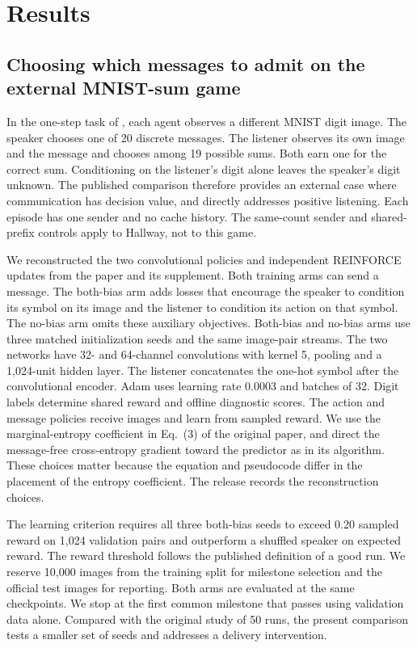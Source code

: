 \documentclass[a4paper,fleqn]{cas-dc}
\begin{document}
\section{Results}
\subsection{Choosing which messages to admit on the external MNIST-sum game}\label{sec:eccles}
In the one-step task of \citet{eccles2019biases}, each agent observes a different MNIST digit image. The speaker chooses one of 20 discrete messages. The listener observes its own image and the message and chooses among 19 possible sums. Both earn one for the correct sum. Conditioning on the listener's digit alone leaves the speaker's digit unknown. The published comparison therefore provides an external case where communication has decision value, and directly addresses positive listening. Each episode has one sender and no cache history. The same-count sender and shared-prefix controls apply to Hallway, not to this game.

We reconstructed the two convolutional policies and independent REINFORCE updates from the paper and its supplement. Both training arms can send a message. The both-bias arm adds losses that encourage the speaker to condition its symbol on its image and the listener to condition its action on that symbol. The no-bias arm omits these auxiliary objectives. Both-bias and no-bias arms use three matched initialization seeds and the same image-pair streams. The two networks have 32- and 64-channel convolutions with kernel 5, pooling and a 1,024-unit hidden layer. The listener concatenates the one-hot symbol after the convolutional encoder. Adam uses learning rate 0.0003 and batches of 32. Digit labels determine shared reward and offline diagnostic scores. The action and message policies receive images and learn from sampled reward. We use the marginal-entropy coefficient in Eq.~(3) of the original paper, and direct the message-free cross-entropy gradient toward the predictor as in its algorithm. These choices matter because the equation and pseudocode differ in the placement of the entropy coefficient. The release records the reconstruction choices.

The learning criterion requires all three both-bias seeds to exceed 0.20 sampled reward on 1,024 validation pairs and outperform a shuffled speaker on expected reward. The reward threshold follows the published definition of a good run. We reserve 10,000 images from the training split for milestone selection and the official test images for reporting. Both arms are evaluated at the same checkpoints. We stop at the first common milestone that passes using validation data alone. Compared with the original study of 50 runs, the present comparison tests a smaller set of seeds and addresses a delivery intervention.
\end{document}
